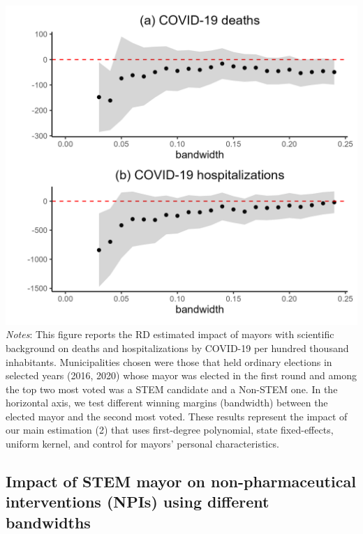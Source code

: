 \documentclass[
  letterpaper,
  DIV=11,
  numbers=noendperiod]{scrartcl}
\begin{document}
\includegraphics{outputs/figures/robust_outcomes.png} \emph{Notes}: This
figure reports the RD estimated impact of mayors with scientific
background on deaths and hospitalizations by COVID-19 per hundred
thousand inhabitants. Municipalities chosen were those that held
ordinary elections in selected years (2016, 2020) whose mayor was
elected in the first round and among the top two most voted was a STEM
candidate and a Non-STEM one. In the horizontal axis, we test different
winning margins (bandwidth) between the elected mayor and the second
most voted. These results represent the impact of our main estimation
(2) that uses first-degree polynomial, state fixed-effects, uniform
kernel, and control for mayors' personal characteristics.

\subsection{Impact of STEM mayor on non-pharmaceutical interventions
(NPIs) using different
bandwidths}\label{impact-of-stem-mayor-on-non-pharmaceutical-interventions-npis-using-different-bandwidths}
\end{document}
